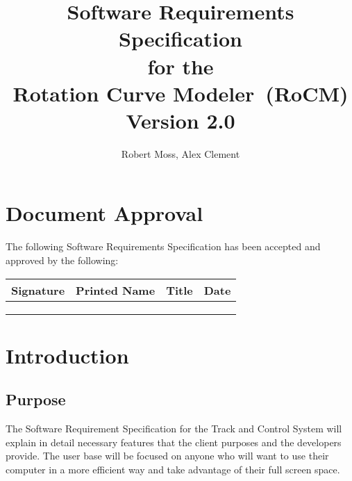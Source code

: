 \documentclass[titlepage]{article}
\def \RoCM {Rotation Curve Modeler}
\begin{document}
\title{
\textbf{
Software Requirements Specification}
\protect\\
for the
\protect\\
\textbf{
\RoCM\ (RoCM)}
\protect\\
{\small Version 2.0}}

\author{Robert Moss, Alex Clement}
\maketitle

\section*{Document Approval}

The following Software Requirements Specification has been accepted and approved by the following:

\begin{center}
    \begin{tabularx}{\textwidth}{ |X|X|X|X| }
    \hline
    \textbf{Signature} & \textbf{Printed Name} & \textbf{Title} & \textbf{Date} \\ \hline
     &  &  &  \\ \hline
     &  &  &  \\ \hline
     &  &  &  \\ \hline
    \end{tabularx}
\end{center}

\newpage
\tableofcontents{} 
\newpage

\section{Introduction}

\subsection{Purpose}
The Software Requirement Specification for the Track and Control System will explain in detail necessary features that the client purposes and the developers provide. The user base will be focused on anyone who will want to use their computer in a more efficient way and take advantage of their full screen space. 
\end{document}
